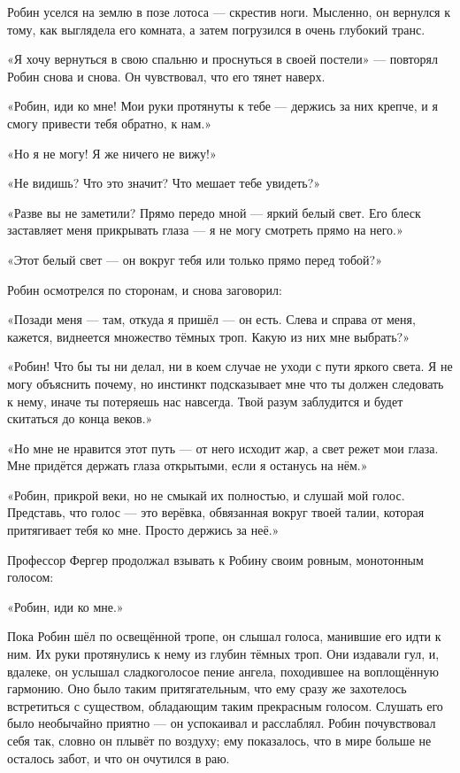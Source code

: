 \documentclass[a4paper,12pt]{book}
\begin{document}
\par
Робин уселся на землю в позе лотоса — скрестив ноги. Мысленно, он вернулся к тому, как выглядела его комната, а затем погрузился в очень глубокий транс.
\par
«Я хочу вернуться в свою спальню и проснуться в своей постели» — повторял Робин снова и снова. Он чувствовал, что его тянет наверх.
\par
«Робин, иди ко мне! Мои руки протянуты к тебе — держись за них крепче, и я смогу привести тебя обратно, к нам.»
\par
«Но я не могу! Я же ничего не вижу!»
\par
«Не видишь? Что это значит? Что мешает тебе увидеть?»
\par
«Разве вы не заметили? Прямо передо мной — яркий белый свет. Его блеск заставляет меня прикрывать глаза — я не могу смотреть прямо на него.»
\par
«Этот белый свет — он вокруг тебя или только прямо перед тобой?»
\par
Робин осмотрелся по сторонам, и снова заговорил:
\par
«Позади меня — там, откуда я пришёл — он есть. Слева и справа от меня, кажется, виднеется множество тёмных троп. Какую из них мне выбрать?»
\par
«Робин! Что бы ты ни делал, ни в коем случае не уходи с пути яркого света. Я не могу объяснить почему, но инстинкт подсказывает мне что ты должен следовать к нему, иначе ты потеряешь нас навсегда. Твой разум заблудится и будет скитаться до конца веков.»
\par
«Но мне не нравится этот путь — от него исходит жар, а свет режет мои глаза. Мне придётся держать глаза открытыми, если я останусь на нём.»
\par
«Робин, прикрой веки, но не смыкай их полностью, и слушай мой голос. Представь, что голос — это верёвка, обвязанная вокруг твоей талии, которая притягивает тебя ко мне. Просто держись за неё.»
\par
Профессор Фергер продолжал взывать к Робину своим ровным, монотонным голосом:
\par
«Робин, иди ко мне.»
\par
Пока Робин шёл по освещённой тропе, он слышал голоса, манившие его идти к ним. Их руки протянулись к нему из глубин тёмных троп. Они издавали гул, и, вдалеке, он услышал сладкоголосое пение ангела, походившее на воплощённую гармонию. Оно было таким притягательным, что ему сразу же захотелось встретиться с существом, обладающим таким прекрасным голосом. Слушать его было необычайно приятно — он успокаивал и расслаблял. Робин почувствовал себя так, словно он плывёт по воздуху; ему показалось, что в мире больше не осталось забот, и что он очутился в раю.
\end{document}
